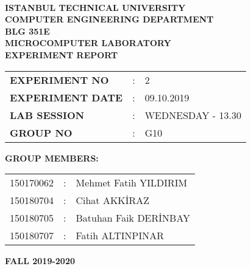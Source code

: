 \documentclass[pdftex,12pt,a4paper]{article}
\begin{document}
\begin{titlepage}
\begin{center}
\textbf{}\\
\textbf{\Large{ISTANBUL TECHNICAL UNIVERSITY}}\\
\vspace{0.5cm}
\textbf{\Large{COMPUTER ENGINEERING DEPARTMENT}}\\
\vspace{2cm}
\textbf{\Large{BLG 351E\\ MICROCOMPUTER LABORATORY\\ EXPERIMENT REPORT}}\\
\vspace{2.8cm}
\begin{table}[ht]
\centering
\Large{
\begin{tabular}{lcl}
\textbf{EXPERIMENT NO}  & : & 2 \\
\textbf{EXPERIMENT DATE}  & : & 09.10.2019 \\
\textbf{LAB SESSION}  & : & WEDNESDAY - 13.30 \\
\textbf{GROUP NO}  & : & G10 \\
\end{tabular}}
\end{table}
\vspace{1cm}
\textbf{\Large{GROUP MEMBERS:}}\\
\begin{table}[ht]
\centering
\Large{
\begin{tabular}{rcl}
150170062  & : & Mehmet Fatih YILDIRIM \\
150180704  & : & Cihat AKK\.{I}RAZ \\
150180705  & : & Batuhan Faik DER\.{I}NBAY \\
150180707  & : & Fatih ALTINPINAR \\
\end{tabular}}
\end{table}
\vspace{2.8cm}
\textbf{\Large{FALL 2019-2020}}

\end{center}

\end{titlepage}

\newpage


\thispagestyle{empty}
\setcounter{tocdepth}{4}
\tableofcontents
\clearpage

\setcounter{page}{1}
\end{document}
